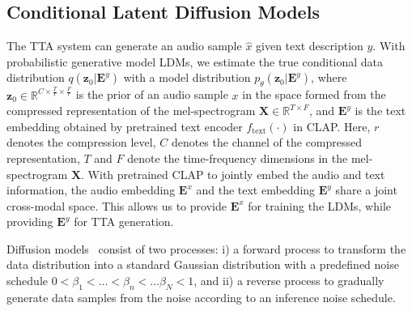 \subsection{Conditional Latent Diffusion Models}
\label{CLDMs}

The TTA system can generate an audio sample $\hat{x}$ given text description $y$. With probabilistic generative model LDMs, we estimate the true conditional data distribution $q(\boldsymbol{z}_{0}|\boldsymbol{E}^{y})$ with a model distribution $p_{\theta}(\boldsymbol{z}_{0}|\boldsymbol{E}^{y})$, where $\boldsymbol{z}_{0}\in \mathbb{R}^{C\times \frac{T}{r}\times \frac{F}{r}}$ is the prior of an audio sample $x$ in the space formed from the compressed representation of the mel-spectrogram $\boldsymbol{X}\in \mathbb{R}^{T\times F}$, and $\boldsymbol{E}^{y}$ is the text embedding obtained by pretrained text encoder $f_{\text{text}}(\cdot)$ in CLAP. Here, $r$ denotes the compression level, $C$ denotes the channel of the compressed representation, $T$ and $F$ denote the time-frequency dimensions in the mel-spectrogram $\boldsymbol{X}$. With pretrained CLAP to jointly embed the audio and text information, the audio embedding $\boldsymbol{E}^{x}$ and the text embedding $\boldsymbol{E}^{y}$ share a joint cross-modal space. This allows us to provide $\boldsymbol{E}^{x}$ for training the LDMs, while providing $\boldsymbol{E}^{y}$ for TTA generation.

Diffusion models~\cite{DDPM, SGM} consist of two processes: i) a forward process to transform the data distribution into a standard Gaussian distribution with a predefined noise schedule $ 0 < \beta_{1} < \dots < \beta_{n} < \dots \beta_{N} < 1$, and ii) a reverse process to gradually generate data samples from the noise according to an inference noise schedule. 

